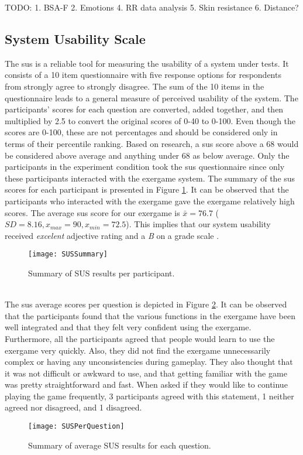 TODO:
1. BSA-F
2. Emotions
4. RR data analysis
5. Skin resistance
6. Distance?
\subsection{System Usability Scale}
The \acrfull{sus} is a reliable tool for measuring the usability of a system under tests. It consists of a 10 item questionnaire with five response options for respondents from strongly agree to strongly disagree. The sum of the 10 items in the questionnaire leads to a general measure of perceived usability of the system. The participants' scores for each question are converted, added together, and then multiplied by 2.5 to convert the original scores of 0-40 to 0-100. Even though the scores are 0-100, these are not percentages and should be considered only in terms of their percentile ranking. Based on research, a  \acrshort{sus} score above a 68 would be considered above average and anything under 68 as below average. Only the participants in the experiment condition took the \acrshort{sus} questionnaire since only these participants interacted with the exergame system. The summary of the \acrshort{sus} scores for each participant is presented in Figure \ref{fig:sus}. It can be observed that the participants who interacted with the exergame gave the exergame relatively high scores. The  average \acrshort{sus} score for our exergame  is \begin{math}\bar{x} = 76.7 \end{math} (\begin{math} SD = 8.16, x_{max}= 90, x_{min}= 72.5\end{math}). This implies that our system usability received \textit{excelent} adjective rating and a \textit{B} on a grade scale \cite{brooke2013sus}.
\begin{figure}[h]
    \centering
    \texttt{[image: SUSSummary]}
    \caption{Summary of SUS results per participant.}
    \label{fig:sus}
\end{figure}\\
The \acrshort{sus} average scores per question is depicted in Figure \ref{fig:susPerQuestion}. It can be observed that the participants found that the various functions in the exergame have been well integrated and that they felt very confident using the exergame. Furthermore, all the participants agreed that people would learn to use the exergame very quickly. Also, they did not find the exergame unnecessarily complex or having any unconsistencies during gameplay. They also thought that it was not difficult or awkward to use, and that getting familiar with the game was pretty straightforward and fast. When asked if they would like to continue playing the game frequently, 3 participants agreed with this statement, 1  neither agreed nor disagreed, and 1 disagreed. \\
\begin{figure}[h]
    \centering
    \texttt{[image: SUSPerQuestion]}
    \caption{Summary of average SUS results for each question.}
    \label{fig:susPerQuestion}
\end{figure}
